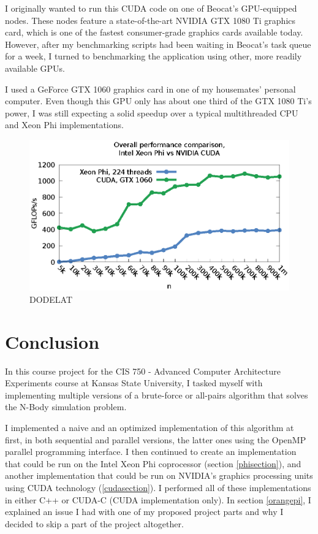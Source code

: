\documentclass[journal]{IEEEtran}
\begin{document}
			
			I originally wanted to run this CUDA code on one of Beocat's GPU-equipped nodes. These nodes feature a state-of-the-art NVIDIA GTX 1080 Ti graphics card, which is one of the fastest consumer-grade graphics cards available today. However, after my benchmarking scripts had been waiting in Beocat's task queue for a week, I turned to benchmarking the application using other, more readily available GPUs.
			
			I used a GeForce GTX 1060 graphics card in one of my housemates' personal computer. Even though this GPU only has about one third of the GTX 1080 Ti's power, I was still expecting a solid speedup over a typical multithreaded CPU and Xeon Phi implementations.
			
			\begin{figure}[ht]			
				\centering
				\includegraphics[width=.5\textwidth]{gnuplot/cuda.eps}
				\caption{\label{cuda} DODELAT} %
			\end{figure} 


	\section{Conclusion}
	
	
		In this course project for the CIS 750 - Advanced Computer Architecture Experiments course at Kansas State University, I tasked myself with implementing multiple versions of a brute-force or all-pairs algorithm that solves the N-Body simulation problem.
		
		I implemented a naive and an optimized implementation of this algorithm at first, in both sequential and parallel versions, the latter ones using the OpenMP parallel programming interface. I then continued to create an implementation that could be run on the Intel Xeon Phi coprocessor (section \ref{phisection}), and another implementation that could be run on NVIDIA's graphics processing units using CUDA technology (\ref{cudasection}). I performed all of these implementations in either C++ or CUDA-C (CUDA implementation only). In section \ref{orangepi}, I explained an issue I had with one of my proposed project parts and why I decided to skip a part of the project altogether. 
		
\end{document}
